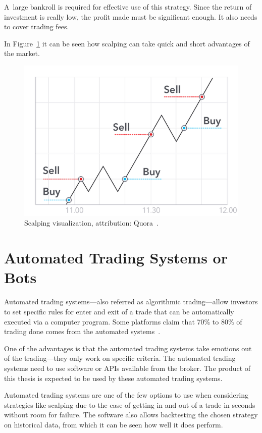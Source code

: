 A~large bankroll is required for effective use of this strategy. Since the return of investment is really low, the profit made must be significant enough. It also needs to cover trading fees.

In Figure~\ref{scalping-figure} it can be seen how scalping can take quick and short advantages of the market.

\begin{figure}[!hbt]
    \centering
    \includegraphics[width=\columnwidth]{figures/scalping.png}
    \caption{Scalping visualization, attribution: Quora~\cite{best-crypto-daytrading}.}
    \label{scalping-figure}
\end{figure}

\section{Automated Trading Systems or Bots}
\label{bots}
Automated trading systems---also referred as algorithmic trading---allow investors to set specific rules for enter and exit of a trade that can be automatically executed via a computer program. Some platforms claim that 70\% to 80\% of trading done comes from the automated systems~\cite{investopedia-bot-trading}.

One of the advantages is that the automated trading systems take emotions out of the trading---they only work on specific criteria. The automated trading systems need to use software or APIs available from the broker. The product of this thesis is expected to be used by these automated trading systems.

Automated trading systems are one of the few options to use when considering strategies like scalping due to the ease of getting in and out of a trade in seconds without room for failure. The software also allows backtesting the chosen strategy on historical data, from which it can be seen how well it does perform.

